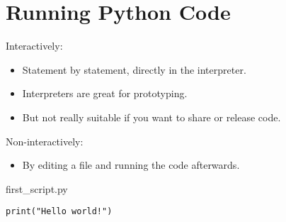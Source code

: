 \documentclass[aspectratio=1610,slidestop]{beamer}
\begin{document}
\section{Running Python Code}
\begin{pframe}
\vspace{-0.5cm}
\begin{minipage}[t]{0.47\textwidth}
  Interactively:
  {\small
  \begin{itemize}
    \item Statement by statement, directly in the interpreter.
  \end{itemize}}
  \pause
  \begin{terminal}
  {\tiny \color{white}{
   \begin{lstlisting}[frame=,style=,numbers=none,aboveskip=-0.1cm,belowskip=-0.1cm]
$ python
Python 3.7 (default, Nov 26 2019, 10:23:46)
[GCC 5.4.0 20160609] on linux
Type "help", "copyright", "credits" or
"license" for more information.
>>> print('Hello world')
Hello world
>>>
  \end{lstlisting}}}
 \end{terminal}
 \pause
 {\small
 \begin{itemize}
  \item Interpreters are great for prototyping.
  \item But not really suitable if you want to share or release code.
 \end{itemize}}
 \end{minipage}\qquad%
 \begin{minipage}[t]{0.47\textwidth}
  \pause
  \vspace{-0.3cm}
  Non-interactively:
  {\small
  \begin{itemize}
   \item By editing a file and running the code afterwards.
  \end{itemize}}
  \pause
  \begin{pythonfile}{first\_script.py}
   \begin{verbatim}
print("Hello world!")
   \end{verbatim}
  \end{pythonfile}
  \pause
  \begin{terminal}
   {\tiny \color{white}{
   \begin{lstlisting}[frame=,style=,numbers=none,aboveskip=-0.1cm,belowskip=-0.1cm]
$ python first_script.py
Hello world
$
   \end{lstlisting}}}
  \end{terminal}
 \end{minipage}
\end{pframe}
\end{document}

